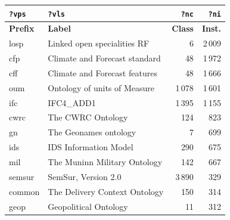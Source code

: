 \begin{table}[h]
\footnotesize
\centering
\begin{tabular}{|l|l|r|r|}
\hline
\textbf{\texttt{?vps}} & \textbf{\texttt{?vls}}                      & \textbf{\texttt{?nc}} & \textbf{\texttt{?ni}} \\ \hline
\hline
\textbf{Prefix} & \textbf{Label}                                                                 & \textbf{Class} & \textbf{Inst.} \\ \hline
losp       & Linked open specialities RF                                                                     & 6    & 2\,009 \\ \hline
cfp        & Climate and Forecast standard                                                                   & 48   & 1\,972 \\ \hline
cff        & Climate and Forecast features                                                                   & 48   & 1\,666 \\ \hline
oum        & Ontology of units of Measure                                                                    & 1\,078 & 1\,601 \\ \hline
ifc        & IFC4\_ADD1                                                                                      & 1\,395 & 1\,155 \\ \hline
cwrc       & The CWRC Ontology                                                                               & 124  & 823  \\ \hline
gn         & The Geonames ontology                                                                           & 7    & 699  \\ \hline
ids        & IDS Information Model                                                                           & 290  & 675  \\ \hline
mil        & The Muninn Military Ontology                                                                    & 142  & 667  \\ \hline
semsur     & SemSur, Version 2.0                                                                             & 3\,890 & 329  \\ \hline
common     & The Delivery Context Ontology                                                                   & 150  & 314  \\ \hline
geop       & Geopolitical Ontology                                                                           & 11   & 312  \\ \hline

\end{tabular}
\end{table}
